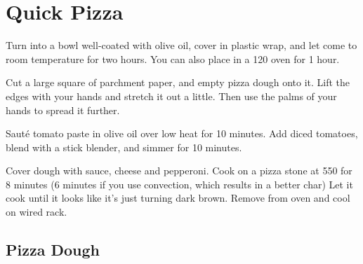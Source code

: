 \section{Quick Pizza}
\begin{recipe}



Turn into a bowl well-coated with olive oil, cover in plastic wrap, and let
come to room temperature for two hours. You can also place in a 120\degree{} oven
for 1 hour.

Cut a large square of parchment paper, and empty pizza dough onto it. Lift the
edges with your hands and stretch it out a little. Then use the palms of your
hands to spread it further.


Sauté tomato paste in olive oil over low heat for 10 minutes. Add
diced tomatoes, blend with a stick blender, and simmer for 10 minutes.


Cover dough with sauce, cheese and pepperoni. Cook on a pizza stone at 550\degree{} for 8 minutes
(6 minutes if you use convection, which results in a better char)
Let it cook until it looks like it's just turning dark brown. Remove from oven
and cool on wired rack.


\subsection{Pizza Dough}



\end{recipe}

